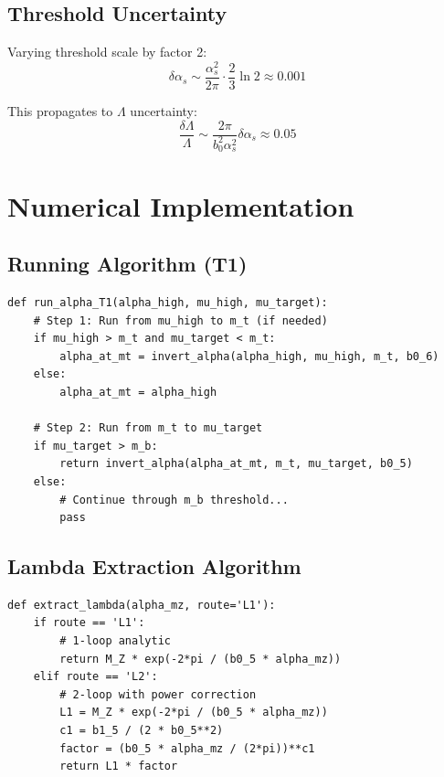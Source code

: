 \documentclass[11pt,a4paper]{article}
\theoremstyle{definition}
\begin{document}
\subsection{Threshold Uncertainty}
\label{subsec:threshold-uncert}

Varying threshold scale by factor 2:
\begin{equation}
\label{eq:thresh-scale-var}
\delta\alpha_s \sim \frac{\alpha_s^2}{2\pi} \cdot \frac{2}{3}\ln 2 \approx 0.001
\end{equation}

This propagates to $\Lambda$ uncertainty:
\begin{equation}
\label{eq:thresh-lambda-uncert}
\frac{\delta\Lambda}{\Lambda} \sim \frac{2\pi}{b_0^2\alpha_s^2}\delta\alpha_s \approx 0.05
\end{equation}

\section{Numerical Implementation}
\label{app:numerical-impl}

\subsection{Running Algorithm (T1)}
\label{subsec:algorithm-t1}

\begin{verbatim}
def run_alpha_T1(alpha_high, mu_high, mu_target):
    # Step 1: Run from mu_high to m_t (if needed)
    if mu_high > m_t and mu_target < m_t:
        alpha_at_mt = invert_alpha(alpha_high, mu_high, m_t, b0_6)
    else:
        alpha_at_mt = alpha_high

    # Step 2: Run from m_t to mu_target
    if mu_target > m_b:
        return invert_alpha(alpha_at_mt, m_t, mu_target, b0_5)
    else:
        # Continue through m_b threshold...
        pass
\end{verbatim}

\subsection{Lambda Extraction Algorithm}
\label{subsec:lambda-algorithm}

\begin{verbatim}
def extract_lambda(alpha_mz, route='L1'):
    if route == 'L1':
        # 1-loop analytic
        return M_Z * exp(-2*pi / (b0_5 * alpha_mz))
    elif route == 'L2':
        # 2-loop with power correction
        L1 = M_Z * exp(-2*pi / (b0_5 * alpha_mz))
        c1 = b1_5 / (2 * b0_5**2)
        factor = (b0_5 * alpha_mz / (2*pi))**c1
        return L1 * factor
\end{verbatim}
\end{document}
